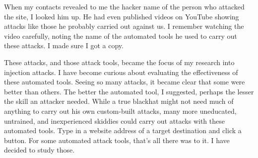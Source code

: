 When my contacts revealed to me the hacker name of the person who attacked the site, I looked him up.  He had even published videos on YouTube showing attacks like those he probably carried out against us.  I remember watching the video carefully, noting the name of the automated tools he used to carry out these attacks.  I made sure I got a copy.

These attacks, and those \gls{attack} tools, became the focus of my research into injection attacks.  I have become curious about evaluating the effectiveness of these automated tools.  Seeing so many attacks, it became clear that some were better than others.  The better the automated tool, I suggested, perhaps the lesser the skill an attacker needed.  While a true blackhat might not need much of anything to carry out his own custom-built attacks, many more uneducated, untrained, and inexperienced skiddies could carry out attacks with these automated tools.  Type in a website address of a target destination and click a button.  For some automated \gls{attack} tools, that's all there was to it.  I have decided to study those.

\markchapterendnotes